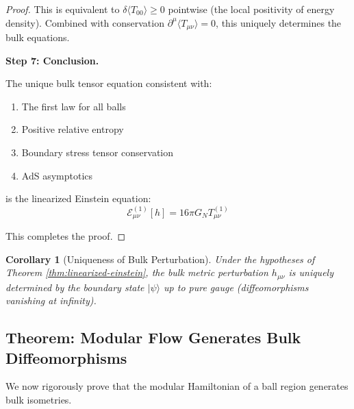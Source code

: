 \documentclass[12pt,a4paper]{article}
\newtheorem{corollary}[theorem]{Corollary}
\begin{document}
\begin{proof}
This is equivalent to $\delta\langle T_{00} \rangle \geq 0$ pointwise (the local positivity of energy density). Combined with conservation $\partial^\mu \langle T_{\mu\nu} \rangle = 0$, this uniquely determines the bulk equations.

\textbf{Step 7: Conclusion.}

The unique bulk tensor equation consistent with:
\begin{enumerate}
    \item The first law for all balls
    \item Positive relative entropy
    \item Boundary stress tensor conservation
    \item AdS asymptotics
\end{enumerate}
is the linearized Einstein equation:
\begin{equation}
\mathcal{E}_{\mu\nu}^{(1)}[h] = 16\pi G_N T_{\mu\nu}^{(1)}
\end{equation}

This completes the proof.
\end{proof}

\begin{corollary}[Uniqueness of Bulk Perturbation]
Under the hypotheses of Theorem \ref{thm:linearized-einstein}, the bulk metric perturbation $h_{\mu\nu}$ is uniquely determined by the boundary state $|\psi\rangle$ up to pure gauge (diffeomorphisms vanishing at infinity).
\end{corollary}

\subsection{Theorem: Modular Flow Generates Bulk Diffeomorphisms}

We now rigorously prove that the modular Hamiltonian of a ball region generates bulk isometries.
\end{document}
